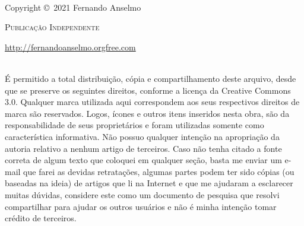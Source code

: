 \documentclass[a4paper,11pt]{book} %
\begin{document}
\begingroup
\thispagestyle{empty}
\vfill
\endgroup

\newpage
~\vfill
\thispagestyle{empty}

\noindent Copyright \copyright\ 2021 Fernando Anselmo%

\noindent \textsc{Publicação Independente} %

\noindent \url{http://fernandoanselmo.orgfree.com} %

\noindent \\ É permitido a total distribuição, cópia e compartilhamento deste arquivo, desde que se preserve os seguintes direitos, conforme a licença da Creative Commons 3.0. Qualquer marca utilizada aqui correspondem aos seus respectivos direitos de marca são reservados. Logos, ícones e outros itens inseridos nesta obra, são da responsabilidade de seus proprietários e foram utilizadas somente como característica informativa. Não possuo qualquer intenção na apropriação da autoria relativo a nenhum artigo de terceiros. Caso não tenha citado a fonte correta de algum texto que coloquei em qualquer seção, basta me enviar um e-mail que farei as devidas retratações, algumas partes podem ter sido cópias (ou baseadas na ideia) de artigos que li na Internet e que me ajudaram a esclarecer muitas dúvidas, considere este como um documento de pesquisa que resolvi compartilhar para ajudar os outros usuários e não é minha intenção tomar crédito de terceiros. %

\end{document}
